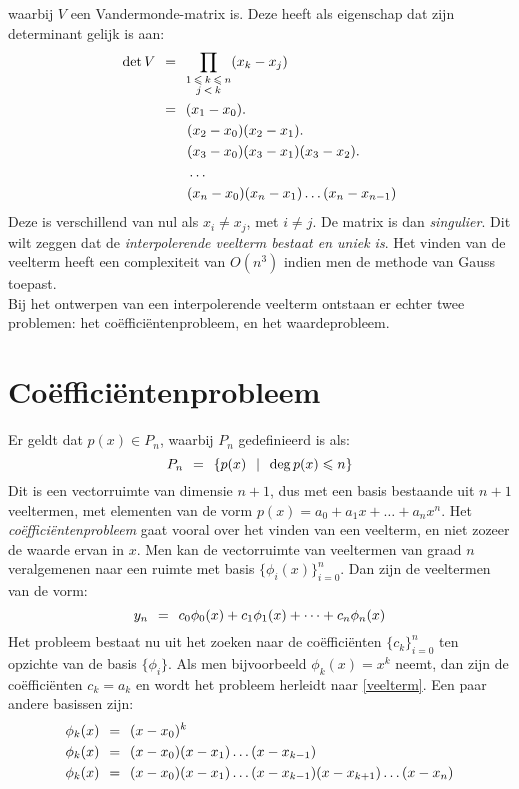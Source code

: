 \documentclass[11pt]{report}
\def \eq {\hspace{1.5mm}=\hspace{1.5mm}}
\def \hmid {\hspace{1.5mm}\mid \hspace{1.5mm}}
\def \v {\vspace{2mm}}
\begin{document}
	waarbij $V$ een Vandermonde-matrix is. Deze heeft als eigenschap dat zijn determinant gelijk is aan:
	\begin{align*}
		\det V &\eq \prod_{\substack{1 \hspace{0.6mm}\leqslant\hspace{0.6mm} k \hspace{0.6mm}\leqslant\hspace{0.6mm} n \\ j \hspace{0.6mm}<\hspace{0.6mm} k}} (x_k - x_j)\\
		&\eq  (x_1 - x_0).\\
		& \hspace{8mm} (x_2 - x_0)(x_2 - x_1).\\
		&\hspace{8mm}(x_3 - x_0)(x_3 - x_1)(x_3 - x_2).\\
		&\hspace{8mm}\dots\\
		&\hspace{8mm}(x_n - x_0)(x_n - x_1)\dots(x_n - x_{n-1})
	\end{align*}
	Deze is verschillend van nul als $x_i \neq x_j$, met $i \neq j$. De matrix is dan \textit{singulier}. Dit wilt zeggen dat de \textit{interpolerende veelterm bestaat en uniek is}. Het vinden van de veelterm heeft een complexiteit van $O(n^3)$ indien men de methode van Gauss toepast. \v\\Bij het ontwerpen van een interpolerende veelterm ontstaan er echter twee problemen: het co\"{e}ffici\"{e}ntenprobleem, en het waardeprobleem.
\section{Co\"{e}ffici\"{e}ntenprobleem}
	Er geldt dat $p(x) \in P_n$, waarbij $P_n$ gedefinieerd is als:
	$$P_n \eq \{p(x) \hmid \deg p(x) \leqslant n \}$$
	Dit is een vectorruimte van dimensie $n+1$, dus met een basis bestaande uit $n+1$ veeltermen, met elementen van de vorm $p(x) = a_0 + a_1x + \dots + a_nx^n$. Het \textit{co\"{e}ffici\"{e}ntenprobleem} gaat vooral over het vinden van een veelterm, en niet zozeer de waarde ervan in $x$. Men kan de vectorruimte van veeltermen van graad $n$ veralgemenen naar een ruimte met basis $\{\phi_i(x)\}_{i=0}^n$. Dan zijn de veeltermen van de vorm:
	$$y_n \eq c_0 \phi_0(x) + c_1\phi_1(x) + \dots + c_n\phi_n(x)$$
	Het probleem bestaat nu uit het zoeken naar de co\"{e}ffici\"{e}nten $\{c_k\}_{i=0}^n$ ten opzichte van de basis $\{\phi_i\}$. Als men bijvoorbeeld $\phi_k(x) = x^k$ neemt, dan zijn de co\"{e}ffici\"{e}nten $c_k = a_k$ en wordt het probleem herleidt naar \ref{veelterm}. Een paar andere basissen zijn:
	\begin{align*}
		\phi_k(x) &\eq (x - x_0)^k \\
		\phi_k(x) &\eq (x - x_0)(x - x_1) \dots (x-x_{k-1}) \\
		\phi_k(x) &\eq (x - x_0)(x - x_1) \dots (x - x_{k-1})(x - x_{k+1})\dots (x-x_n)
	\end{align*}
	
\end{document}
